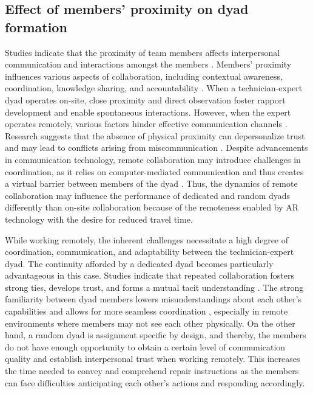 \documentclass[msom,nonblindrev]{01 latex/class/informs3}
\begin{document}
\subsection{Effect of members' proximity on dyad formation}
Studies indicate that the proximity of team members affects interpersonal communication and interactions amongst the members \citep{hoegl2004team, kahn1997empirical}. Members' proximity influences various aspects of collaboration, including contextual awareness, coordination, knowledge sharing, and accountability \citep{herbsleb1999architectures, olson2000distance}. When a technician-expert dyad operates on-site, close proximity and direct observation foster rapport development and enable spontaneous interactions. However, when the expert operates remotely, various factors hinder effective communication channels \citep{espinosa2007familiarity}. Research suggests that the absence of physical proximity can depersonalize trust \citep{nandhakumar2002virtual} and may lead to conflicts arising from miscommunication \citep{kankanhalli2006conflict}. Despite advancements in communication technology, remote collaboration may introduce challenges in coordination, as it relies on computer-mediated communication and thus creates a virtual barrier between members of the dyad \citep{daft1986organizational}. Thus, the dynamics of remote collaboration may influence the performance of dedicated and random dyads differently than on-site collaboration because of the remoteness enabled by AR technology with the desire for reduced travel time. 

While working remotely, the inherent challenges necessitate a high degree of coordination, communication, and adaptability between the technician-expert dyad. The continuity afforded by a dedicated dyad becomes particularly advantageous in this case. Studies indicate that repeated collaboration fosters strong ties, develops trust, and forms a mutual tacit understanding \citep{edmondson2012teaming, maloney2019lasting, lewicki1996developing}. The strong familiarity between dyad members lowers misunderstandings about each other's capabilities \citep{harrison2003time} and allows for more seamless coordination \citep{reagans2005individual}, especially in remote environments where members may not see each other physically. On the other hand, a random dyad is assignment specific by design, and thereby, the members do not have enough opportunity to obtain a certain level of communication quality and establish interpersonal trust when working remotely. This increases the time needed to convey and comprehend repair instructions as the members can face difficulties anticipating each other's actions and responding accordingly. 
\end{document}
